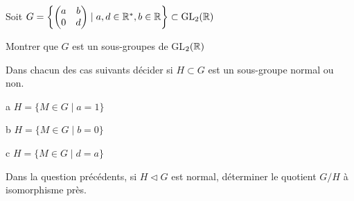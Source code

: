 \documentclass{report}
\begin{document}
\begin{exo}
    Soit \(G=\left\{\begin{pmatrix}a&b\\0&d\end{pmatrix}\mid a,d\in\mathbb{R}^*, b\in\mathbb{R}
    \right\}\subset \text{GL}_2(\mathbb{R})\)
    \begin{q}{1}
        Montrer que \(G\) est un sous-groupes de GL\(_2(\mathbb{R})\)
    \end{q}
    \begin{q}{2}
        Dans chacun des cas suivants décider si \(H\subset G\) est un sous-groupe
        normal ou non.
        \begin{q}{a}
            \(H=\{M \in G \mid a = 1\}\)
        \end{q}
        \begin{q}{b}
            \(H=\{M \in G \mid b = 0\}\)
        \end{q}
        \begin{q}{c}
            \(H=\{M \in G \mid d = a\}\)
        \end{q}
    \end{q}
    \begin{q}{3}
        Dans la question précédents, si \(H\triangleleft G\) est normal, déterminer
        le quotient \(G/H\) à isomorphisme près.
    \end{q}
\end{exo}
\end{document}
